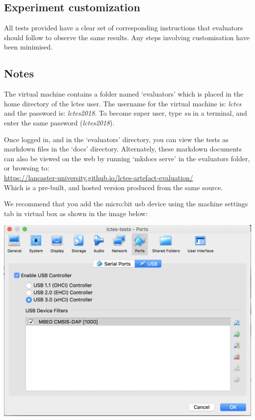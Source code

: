 {%
\subsection{Experiment customization}

All tests provided have a clear set of corresponding instructions that evaluators should follow to observe the same results. Any steps involving customisation have been minimised.

\subsection{Notes}

The virtual machine contains a folder named `evaluators' which is placed in the home directory of the lctes user. The username for the virtual machine is: \textit{lctes} and the password is: \textit{lctes2018}. To become super user, type \textit{su} in a terminal, and enter the same password (\textit{lctes2018}).

Once logged in, and in the `evaluators' directory, you can view the tests as markdown files in the `docs' directory. Alternately, these markdown documents can also be viewed on the web by running `mkdocs serve' in the evaluators folder, or browsing to:\\[5pt]\url{https://lancaster-university.github.io/lctes-artefact-evaluation/}\\[5pt] Which is a pre-built, and hosted version produced from the same source.

We recommend that you add the micro:bit usb device using the machine settings tab in virtual box as shown in the image below:

\begin{center}
\includegraphics[width=\columnwidth]{images/virtualbox.png}
\end{center}

}
